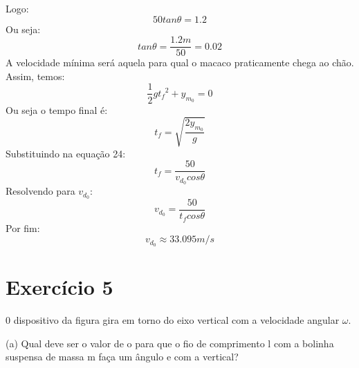 \documentclass[12pt, a4paper]{article} %
\begin{document}
    Logo:
    \begin{equation}
        50 tan\theta = 1.2
    \end{equation}
    Ou seja:
    \begin{equation}
        tan\theta = \frac{1.2m}{50} = 0.02
    \end{equation}
    A velocidade m\'inima ser\'a aquela para qual o macaco praticamente chega ao ch\~ao. Assim, temos:
    \begin{equation}
        \frac{1}{2}g{t_{f}}^{2} + y_{m_{0}} = 0
    \end{equation}
    Ou seja o tempo final \'e:
    \begin{equation}
        t_{f} = \sqrt{\frac{2y_{m_{0}}}{g}}
    \end{equation}
    Substituindo na equa\c{c}\~ao 24:
    \begin{equation}
        t_{f} = \frac{50}{v_{d_{0}}cos\theta}
    \end{equation}
    Resolvendo para $v_{d_{0}}$:
    \begin{equation}
        v_{d_{0}} = \frac{50}{t_{f}cos\theta}
    \end{equation}
    Por fim:
    \begin{equation}
        v_{d_{0}} \approx 33.095 m/s
    \end{equation}

\section{Exerc\'icio 5}
    0 dispositivo da figura gira em torno do eixo vertical com a velocidade angular $\omega$.
    
    (a) Qual deve ser o valor de o para que o fio de comprimento l com a bolinha suspensa de massa m fa\c{c}a um \^angulo e com a vertical?
    
\end{document}
